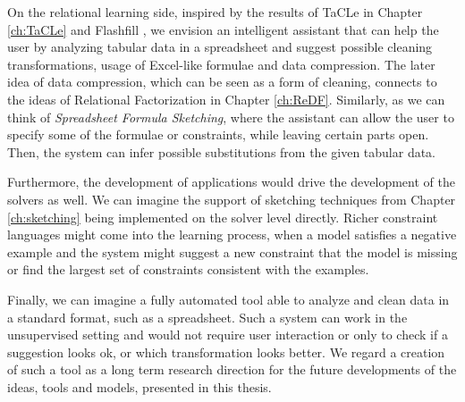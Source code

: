 On the relational learning side, inspired by the results of TaCLe
\parencite{tacle} in Chapter \ref{ch:TaCLe} and Flashfill \parencite{flashfill}, we envision an intelligent
assistant that can help the user by analyzing tabular data in a
spreadsheet and suggest possible cleaning transformations, usage of
Excel-like formulae and data compression. The later idea of data
compression, which can be seen as a form of cleaning, connects to the
ideas of Relational Factorization in Chapter \ref{ch:ReDF}.
Similarly, as we can think of \textit{Spreadsheet Formula Sketching}, where the assistant can allow the user to specify some of the
formulae or constraints, while leaving certain parts open. Then, the
system can infer possible substitutions from the given tabular data.

Furthermore, the development of applications would drive  the
development of the solvers as well. We can imagine the support of
sketching techniques from Chapter \ref{ch:sketching} being implemented
on the solver level directly. Richer constraint languages might come
into the learning process, when a model satisfies a negative example
and the system might suggest a new constraint that the model is
missing or find the largest set of constraints consistent with the
examples.

Finally, we can imagine a fully automated tool able to analyze and
clean data in a standard format, such as a spreadsheet. Such a system
can work in the unsupervised setting and would not require  user interaction
or only to check if a suggestion looks ok, or which transformation looks better.
We regard a creation of such a tool as a long term research direction for
the future developments of the ideas, tools and models, presented in
this thesis.

\cleardoublepage

